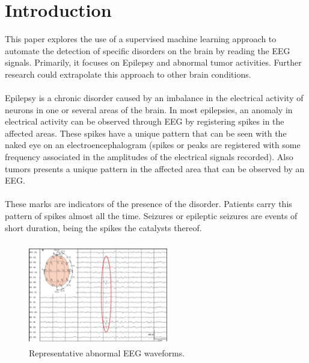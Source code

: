 \documentclass{llncs}       %
\begin{document}
\section{Introduction}
\label{intro}

This paper explores the use of a supervised machine learning approach to automate the detection of specific disorders on the brain by reading the EEG signals. Primarily, it focuses on Epilepsy and abnormal tumor activities.  Further research could extrapolate this approach to other brain conditions.

\paragraph{}
Epilepsy is a chronic disorder caused by an imbalance in the electrical activity of neurons in one or several areas of the brain. In most epilepsies, an anomaly in electrical activity can be observed through EEG by registering spikes in the affected areas.  These spikes have a unique pattern that can be seen with the naked eye on an electroencephalogram (spikes or peaks are registered with some frequency associated in the amplitudes of the electrical signals recorded).  Also tumors presents a unique pattern in the affected area that can be observed by an EEG.

\paragraph{}
These marks are indicators of the presence of the disorder. Patients carry this pattern of spikes almost all the time. Seizures or epileptic seizures are events of short duration, being the spikes the catalysts thereof.
\paragraph{}

\begin{figure}[h]
\centering
\includegraphics[width=6.08cm,height=4.36cm]{media/eeg-spike.eps}
\caption{Representative abnormal EEG waveforms.}
\end{figure}
\end{document}
